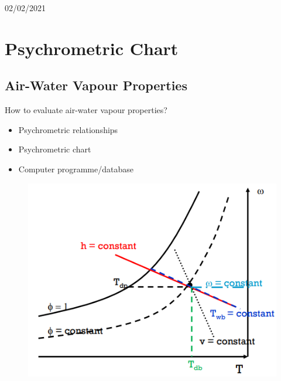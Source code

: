 \documentclass[class=report, crop=false, 12pt,a4paper]{standalone}
\numberwithin{equation}{section}
\begin{document}
\begin{center}
  02/02/2021
\end{center}
\section{Psychrometric Chart}
\subsection{Air-Water Vapour Properties}
How to evaluate air-water vapour properties?
\begin{itemize}[noitemsep]
  \item Psychrometric relationships
  \item Psychrometric chart
  \item Computer programme/database
\end{itemize}
\begin{figure}[H]
  \centering
  \includegraphics[width = 0.5 \textwidth]{../img/diagram105.png}
  \caption{}
\end{figure}
\end{document}
